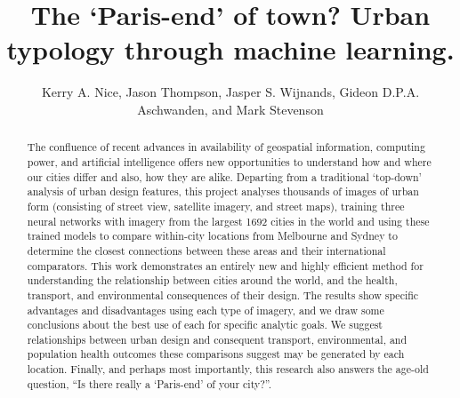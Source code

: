 \documentclass[sageh,times]{sagej}
\begin{document}
%
%


\title{The `Paris-end' of town? Urban typology through machine learning.}

\author{Kerry A. Nice, Jason Thompson, Jasper S. Wijnands, Gideon D.P.A. Aschwanden, and Mark Stevenson}






\begin{abstract}

The confluence of recent advances in availability of geospatial information, computing power, and artificial intelligence offers new opportunities to understand how and where our cities differ and also, how they are alike. Departing from a traditional `top-down' analysis of urban design features, this project analyses thousands of images of urban form (consisting of street view, satellite imagery, and street maps), training three neural networks with imagery from the largest 1692 cities in the world and using these trained models to compare within-city locations from Melbourne and Sydney to determine the closest connections between these areas and their international comparators. This work demonstrates an entirely new and highly efficient method for understanding the relationship between cities around the world, and the health, transport, and environmental consequences of their design. The results show specific advantages and disadvantages using each type of imagery, and we draw some conclusions about the best use of each for specific analytic goals. We suggest relationships between urban design and consequent transport, environmental, and population health outcomes these comparisons suggest may be generated by each location. Finally, and perhaps most importantly, this research also answers the age-old question, ``Is there really a `Paris-end' of your city?''.
\end{abstract}
\end{document}
